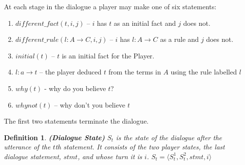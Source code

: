 \documentclass{blue-book}
\newtheorem{definition}{Definition}
\newcommand{\drule}[3]{\ensuremath{#1:#2 \rightarrow #3}}
\begin{document}
At each stage in the dialogue a player may make one of six statements:  
\begin{enumerate}
\item $\mathit{different\_fact(t, i, j)}$ -- $i$ has $t$ as an initial fact and $j$ does not.
\item $\mathit{different\_rule(\drule{l}{A}{C}, i, j)}$ -- $i$ has $\drule{l}{A}{C}$ as a rule and $j$ does not.
\item $initial(t)$ -- $t$ is an initial fact for the Player.
\item $\drule{l}{a}{t}$ -- the player deduced $t$ from the terms in $A$ using the rule labelled $l$
\item $why(t)$ - why do you believe $t$?
\item $whynot(t)$ -- why don't you believe $t$
\end{enumerate}
The first two statements terminate the dialogue.

\begin{definition}{\bf (Dialogue State)}
$S_{t}$ is the state of the dialogue after the utterance of the $t$th statement. It consists of the two player states, the last dialogue statement, $stmt$, and whose turn it is $i$.  $S_{t} = \langle S^1_{t}, S^2_{t}, stmt, i \rangle$
\end{definition}
\end{document}
